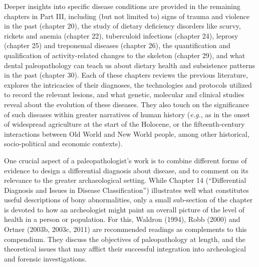 \documentclass{ijsra}
\begin{document}
Deeper insights into specific disease conditions are provided in the remaining chapters in Part III, including (but not limited to) signs of trauma and violence in the past (chapter 20), the study of dietary deficiency disorders like scurvy, rickets and anemia (chapter 22), tuberculoid infections (chapter 24), leprosy (chapter 25) and treponemal diseases (chapter 26), the quantification and qualification of activity-related changes to the skeleton (chapter 29), and what dental paleopathology can teach us about dietary health and subsistence patterns in the past (chapter 30).
Each of these chapters reviews the previous literature, explores the intricacies of their diagnoses, the technologies and protocols utilized to record the relevant lesions, and what genetic, molecular and clinical studies reveal about the evolution of these diseases.
They also touch on the significance of such diseases within greater narratives of human history (\textit{e.g.}, as in the onset of widespread agriculture at the start of the Holocene, or the fifteenth-century interactions between Old World and New World people, among other historical, socio-political and economic contexts).

One crucial aspect of a paleopathologist’s work is to combine different forms of evidence to design a differential diagnosis about disease, and to comment on its relevance to the greater archaeological setting.
While Chapter 14 (“Differential Diagnosis and Issues in Disease Classification”) illustrates well what constitutes useful descriptions of bony abnormalities, only a small sub-section of the chapter is devoted to how an archeologist might paint an overall picture of the level of health in a person or population.
For this, Waldron (1994), Robb (2000) and Ortner (2003b, 2003c, 2011) are recommended readings as complements to this compendium. They discuss the objectives of paleopathology at length, and the theoretical issues that may afflict their successful integration into archeological and forensic investigations.
\end{document}
